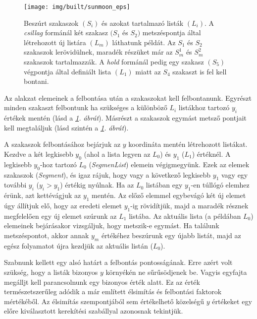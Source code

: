 \documentclass[12pt]{report}
\theoremstyle{definition}
\newcommand{\func}[1]{{\textsl{#1}}}
\begin{document}
  \begin{figure}
    \centering \texttt{[image: img/built/sunmoon\_eps]}
    \caption{\label{sunmoon} Beszúrt
    szakaszok $(S_i)$ és azokat tartalmazó listák $(L_i)$. A \emph{csillag}
    formánál két szakasz $(S_1$ és $S_2)$ metszéspontja által létrehozott új
    listára $(L_m)$ láthatunk példát. Az $S_1$ és $S_2$ szakaszok
    lerövidülnek, maradék részüket már az $S_m^1$ és $S_m^2$ szakaszok
    tartalmazzák. A \emph{hold} formánál pedig egy szakasz $(S_5)$
    végpontja által definiált lista $(L_1)$ miatt az $S_4$ szakaszt is fel
    kell bontani.}
  \end{figure}

Az alakzat elemeinek a felbontása után a szakaszokat kell felbontanunk. Egyrészt
minden szakaszt felbontunk ha szükséges a különböző $L_i$ listákhoz tartozó
$y_i$ értékek mentén (lásd a \emph{\ref{sunmoon}. ábrát}). Másrészt a szakaszok
egymást metsző pontjait kell megtaláljuk (lásd szintén a \emph{\ref{sunmoon}.
ábrát}).

A szakaszok felbontásához bejárjuk az $y$ koordináta mentén létrehozott
listákat. Kezdve a két legkisebb $y_0$ (ahol a lista legyen az $L_0$) és $y_1$
($L_1$) értéknél. A legkisebb $y_0$-hoz tartozó $L_0$ (\func{SegmenList})
elemein végigmegyünk. Ezek az elemek szakaszok (\func{Segment}), és igaz rájuk,
hogy vagy a következő legkisebb $y_1$ vagy egy további $y_i$ ($y_i > y_1$)
értékig nyúlnak. Ha az $L_0$ listában egy $y_1$-en túllógó elemhez érünk, azt
kettévágjuk az $y_1$ mentén. Az előző elemmel egybevágó két új elemet úgy
állítjuk elő, hogy az eredeti elemet $y_1$-ig rövidítjük, majd a maradék
résznek megfelelően egy új elemet szúrunk az $L_1$ listába. Az aktuális lista
(a példában $L_0$) elemeinek bejárásakor vizsgáljuk, hogy metszik-e egymást. Ha
találunk metszéspontot, akkor annak $y_m$ értékéhez beszúrunk egy újabb listát,
majd az egész folyamatot újra kezdjük az aktuális listán ($L_0$).

Szabnunk kellett egy alsó határt a felbontás pontosságának. Erre azért volt
szükség, hogy a listák bizonyos $y$ környékén ne sűrűsödjenek be. Vagyis
egyfajta megálljt kell parancsolnunk egy bizonyos érték alatt. Ez az érték
természetszerűleg adódik a már említett élsimítás és felbontási faktorok
mértékéből. Az élsimítás szempontjából sem értékelhető közelségű $y$ értékeket
egy előre kiválasztott kerekítési szabállyal azonosnak tekintjük.
\end{document}
